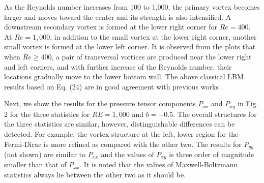 \documentclass[doublecol]{epl2}
\begin{document}
As the Reynolds number increases from 100 to 1,000, the primary vortex becomes larger and moves toward the center and its strength is also intensified. A downstream secondary vortex is formed at the lower right corner for $Re=400$.  At $Re=1,000$, in addition to the small vortex at the lower right corner, another small vortex is formed at the lower left corner. It is observed from the plots that when $Re \ge 400$, a pair of transversal vortices are produced near the lower right and left corners, and with further increase of the Reynolds number, their locations gradually move to the lower bottom wall. The above classical LBM results based on Eq. (24) are in good agreement with previous works \cite{Hou1995,Yang1998,Alben2005}.

Next, we show the results for the pressure tensor components $P_{xx}$ and $P_{xy}$ in Fig. 2 for the three statistics for $RE=1,000$ and $b=-0.5$.  The overall structures for the three statistics are similar, however, distinguishable differences can be detected.  For example, the vortex structure at the left, lower region for the Fermi-Dirac is more refined as compared with the other two. The results for $P_{yy}$ (not shown) are similar to $P_{xx}$ and the values of $P_{xy}$ is three order of magnitude smaller than that of $P_{xx}$.  It is noted that the values of Maxwell-Boltzmann statistics always lie between the other two as it should be.
\end{document}
